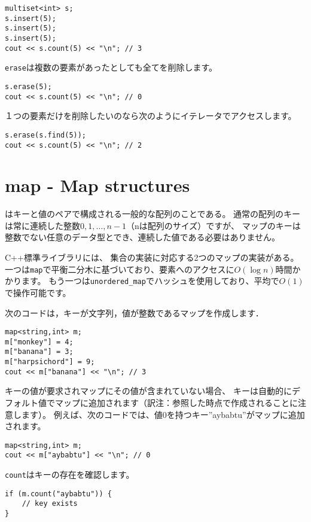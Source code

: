 \begin{lstlisting}
multiset<int> s;
s.insert(5);
s.insert(5);
s.insert(5);
cout << s.count(5) << "\n"; // 3
\end{lstlisting}

\texttt{erase}は複数の要素があったとしても全てを削除します。
\begin{lstlisting}
s.erase(5);
cout << s.count(5) << "\n"; // 0
\end{lstlisting}

１つの要素だけを削除したいのなら次のようにイテレータでアクセスします。
\begin{lstlisting}
s.erase(s.find(5));
cout << s.count(5) << "\n"; // 2
\end{lstlisting}

\section{map - Map structures}


はキーと値のペアで構成される一般的な配列のことである。
通常の配列のキーは常に連続した整数$0,1,\ldots,n-1$（nは配列のサイズ）ですが、
マップのキーは整数でない任意のデータ型とでき、連続した値である必要はありません。

C++標準ライブラリには、
集合の実装に対応する2つのマップの実装がある。
一つは\texttt{map}で平衡二分木に基づいており、要素へのアクセスに$O(\log n)$時間かかります。
もう一つは\texttt{unordered\_map}でハッシュを使用しており、平均で$O(1)$で操作可能です。

次のコードは，キーが文字列，値が整数であるマップを作成します．
\begin{lstlisting}
map<string,int> m;
m["monkey"] = 4;
m["banana"] = 3;
m["harpsichord"] = 9;
cout << m["banana"] << "\n"; // 3
\end{lstlisting}

キーの値が要求されマップにその値が含まれていない場合、
キーは自動的にデフォルト値でマップに追加されます（訳注：参照した時点で作成されることに注意します）。
例えば、次のコードでは、値0を持つキー''aybabtu''がマップに追加されます。

\begin{lstlisting}
map<string,int> m;
cout << m["aybabtu"] << "\n"; // 0
\end{lstlisting}

\texttt{count}はキーの存在を確認します。
\begin{lstlisting}
if (m.count("aybabtu")) {
    // key exists
}
\end{lstlisting}

